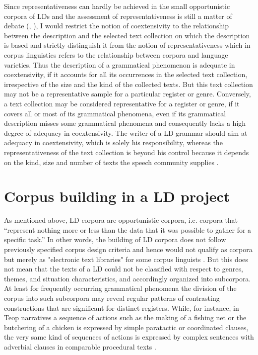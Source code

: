 Since representativeness can hardly be achieved in the small opportunistic corpora of LDs and the assessment of representativeness is still a matter of debate (\citet[86-87]{Clancy2010}, \citet[10]{McEneryEtAl2012}), I would restrict the notion of coextensivity to the relationship between the description and the selected text collection on which the description is based and strictly distinguish it from the notion of representativeness which in corpus linguistics refers to the relationship between corpora and language varieties. Thus the description of a grammatical phenomenon is adequate in coextensivity, if it accounts for all its occurrences in the selected text collection, irrespective of the size and the kind of the collected texts. But this text collection may not be a representative sample for a particular register or genre. Conversely, a text collection may be considered representative for a register or genre, if it covers all or most of its grammatical phenomena, even if its grammatical description misses some grammatical phenomena and consequently lacks a high degree of adequacy in coextensivity. The writer of a LD grammar should aim at adequacy in coextensivity, which is solely his responsibility, whereas the representativeness of the text collection is beyond his control because it depends on the kind, size and number of texts the speech community supplies \citep{Mosel2006b}. 

\section{Corpus building in a LD project}%


As mentioned above, LD corpora are opportunistic corpora, i.e. corpora that ``represent nothing more or less than the data that it was possible to gather for a specific task.'' \citep[11]{McEneryEtAl2012} In other words, the building of LD corpora does not follow previously specified corpus design criteria and hence would not qualify as corpora but merely as {"}electronic text libraries{"} for some corpus linguists \citep[1]{AtkinsEtAl1992}. But this does not mean that the texts of a LD could not be classified with respect to genres, themes, and situation characteristics, and accordingly organized into subcorpora. At least for frequently occurring grammatical phenomena the division of the corpus into such subcorpora may reveal regular patterns of contrasting constructions that are significant for distinct registers. While, for instance, in Teop narratives a sequence of actions such as the making of a fishing net or the butchering of a chicken is expressed by simple paratactic or coordinated clauses, the very same kind of sequences of actions is expressed by complex sentences with adverbial clauses in comparable procedural texts \citet{Moselforthcoming}. 

